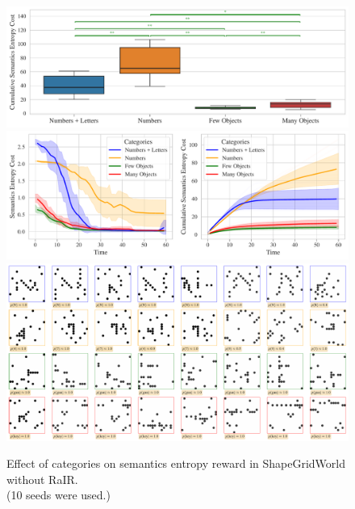 \begin{figure}[H]
    \centering
    \includegraphics[width=\textwidth]{images/categories_boxplot_sgw_norair_cropped.pdf}\vspace{6pt}
    \includegraphics[width=\textwidth]{images/categories_comparison_sgw_norair_cropped.pdf}\vspace{6pt}
    \includegraphics[width=\textwidth]{images/categories_samples_sgw_norair_cropped.pdf}\vspace{3pt}
    \captionsetup{justification=centering}
    \caption[Effect of categories on semantics entropy reward in ShapeGridWorld without RaIR.]{Effect of categories on semantics entropy reward in ShapeGridWorld without RaIR.\\(10 seeds were used.)}
    \label{fig:categories-sgw-norair}
\end{figure}

